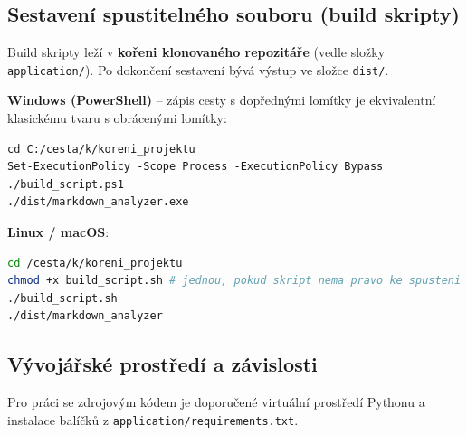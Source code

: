 \documentclass[12pt, a4paper]{article}
\begin{document}
\subsection{Sestavení spustitelného souboru (build skripty)}

Build skripty leží v \textbf{kořeni klonovaného repozitáře} (vedle složky \texttt{application/}). Po dokončení sestavení bývá výstup ve složce \texttt{dist/}.

\textbf{Windows (PowerShell)} -- zápis cesty s dopřednými lomítky je ekvivalentní klasickému tvaru s obrácenými lomítky:

\begin{lstlisting}[basicstyle=\ttfamily\small]
cd C:/cesta/k/koreni_projektu
Set-ExecutionPolicy -Scope Process -ExecutionPolicy Bypass
./build_script.ps1
./dist/markdown_analyzer.exe
\end{lstlisting}

\textbf{Linux / macOS}:

\begin{lstlisting}[language=bash, basicstyle=\ttfamily\small]
cd /cesta/k/koreni_projektu
chmod +x build_script.sh # jednou, pokud skript nema pravo ke spusteni
./build_script.sh
./dist/markdown_analyzer
\end{lstlisting}

\subsection{Vývojářské prostředí a závislosti}

Pro práci se zdrojovým kódem je doporučené virtuální prostředí Pythonu a instalace balíčků z \texttt{application/requirements.txt}.
\end{document}
